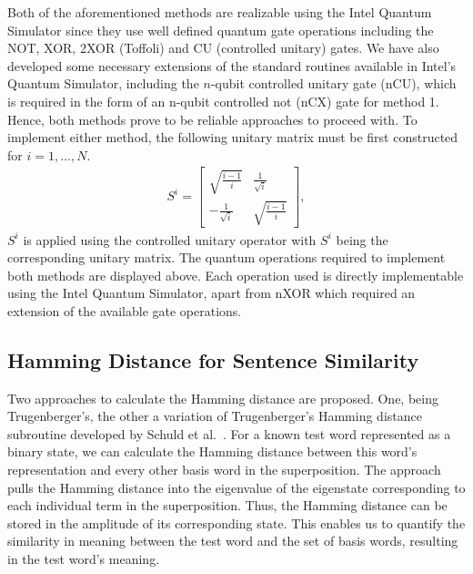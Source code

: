 Both of the aforementioned methods are realizable using the Intel Quantum Simulator since they use well defined quantum gate operations including the NOT, XOR, 2XOR (Toffoli) and CU (controlled unitary) gates. We have also developed some necessary extensions of the standard routines available in Intel's Quantum Simulator, including the $n$-qubit controlled unitary gate (nCU), which is required in the form of an n-qubit controlled not (nCX) gate for method 1. Hence, both methods prove to be reliable approaches to proceed with. To implement either method, the following unitary matrix must be first constructed for $i = 1,\dots,N$.
\begin{align*}
    S^i = 
    \begin{bmatrix}
        \sqrt{\frac{i-1}{i}} & \frac{1}{\sqrt{i}} \\
        -\frac{1}{\sqrt{i}}  & \sqrt{\frac{i-1}{i}}
    \end{bmatrix},
\end{align*}
$S^i$ is applied using the controlled unitary operator with $S^i$ being the corresponding unitary matrix. The quantum operations required to implement both methods are displayed above. Each operation used is directly implementable using the Intel Quantum Simulator, apart from nXOR which required an extension of the available gate operations.


\subsection{Hamming Distance for Sentence Similarity}\label{sub:hamming_dist}
Two approaches to calculate the Hamming distance are proposed. One, being Trugenberger's, the other a variation of Trugenberger's Hamming distance subroutine developed by Schuld et al.~\cite{Trugenberger_2001, Schuld_Sinayskiy_Petruccione_2014}. For a known test word represented as a binary state, we can calculate the Hamming distance between this word's representation and every other basis word in the superposition. The approach pulls the Hamming distance into the eigenvalue of the eigenstate corresponding to each individual term in the superposition. Thus, the Hamming distance can be stored in the amplitude of its corresponding state. This enables us to quantify the similarity in meaning between the test word and the set of basis words, resulting in the test word's meaning.

